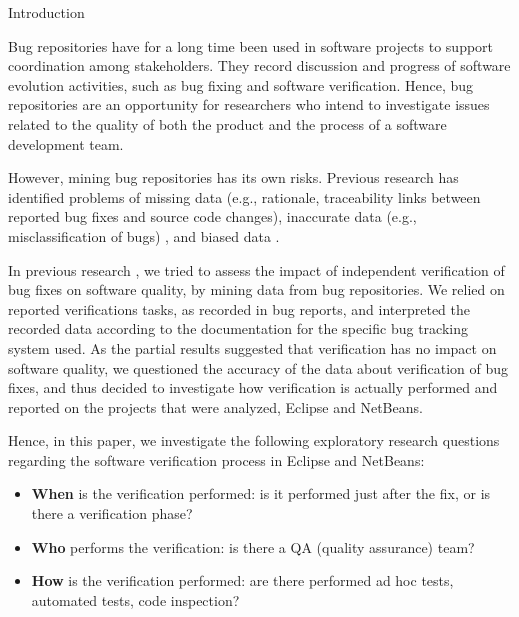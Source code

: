 \begin{section}{Introduction}

Bug repositories have for a long time been used in software projects to support coordination among stakeholders. They record discussion and progress of software evolution activities, such as bug fixing and software verification. Hence, bug repositories are an opportunity for researchers who intend to investigate issues related to the quality of both the product and the process of a software development team.


However, mining bug repositories has its own risks. Previous research has identified problems of missing data \cite{Aranda2009} (e.g., rationale, traceability links between reported bug fixes and source code changes), inaccurate data (e.g., misclassification of bugs) \cite{Antoniol2008}, and biased data \cite{Bird2009}. %

  In previous research \cite{Souza2011}, we tried to assess the impact of independent verification of bug fixes on software quality, by mining data from bug repositories. 
  We relied on reported verifications tasks, as recorded in bug reports, and interpreted the recorded data according to the documentation for the specific bug tracking system used.
  As the partial results suggested that verification has no impact on software quality, we questioned the accuracy of the data about verification of bug fixes, and thus decided to investigate how verification is actually performed and reported on the projects that were analyzed, Eclipse and NetBeans.
	
	Hence, in this paper, we investigate the following exploratory research questions regarding the software verification process in Eclipse and NetBeans:

	\begin{itemize}
		\item \textbf{When} is the verification performed: is it performed just after the fix, or is there a verification phase?
		\item \textbf{Who} performs the verification: is there a QA (quality assurance) team? 		
		\item \textbf{How} is the verification performed: are there performed ad hoc tests, automated tests, code inspection?
	\end{itemize}


\end{section}
